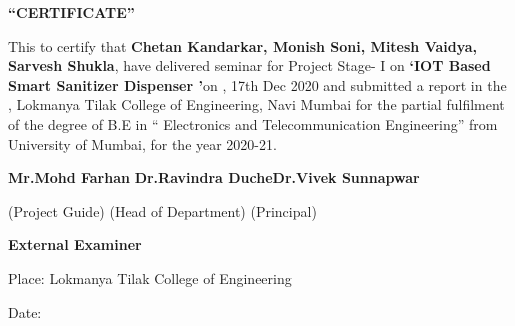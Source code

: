 
\newpage
\thispagestyle{empty}
\begin{center}
\LARGE{\textbf{“CERTIFICATE”} }
\end{center}


\vspace{0.5cm}
This to certify that \textbf{ Chetan Kandarkar, Monish Soni, Mitesh Vaidya, Sarvesh Shukla}, have delivered seminar for Project Stage- I  on  \textbf{\textquoteleft IOT Based Smart Sanitizer Dispenser \textquoteright}on , 17th Dec 2020 and submitted a report in the , Lokmanya Tilak College of Engineering, Navi Mumbai for the partial fulfilment of the degree of B.E in “ Electronics and Telecommunication Engineering” from University of Mumbai, for the year 2020-21.
\vspace{4cm}

\begin{flushleft} \textbf
{Mr.Mohd Farhan} \hspace{10.00mm} \textbf{Dr.Ravindra Duche}\hspace{10.00mm}\textbf{Dr.Vivek Sunnapwar}  \newline



    (Project Guide)  \hspace{19.00mm} (Head of Department) \hspace{18.00mm}
         (Principal)                            
\end{flushleft}






\vspace{2cm}
\begin{flushleft}
\textbf	{External Examiner}     \hspace{100.00mm} %

\vspace{2cm}

Place: Lokmanya Tilak College of Engineering
\vspace{0.5cm}

Date:  
\end{flushleft}


